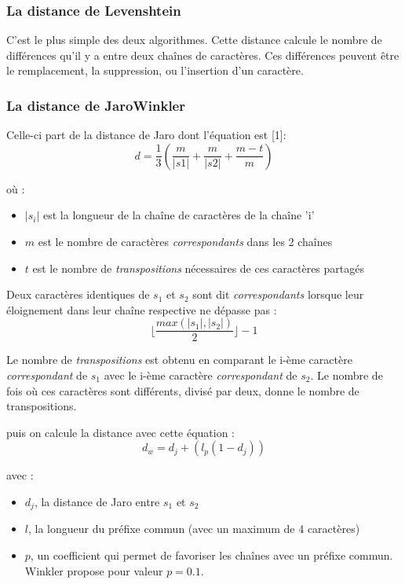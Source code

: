     \subsubsection{La distance de Levenshtein}
C'est le plus simple des deux algorithmes. Cette distance calcule le nombre de différences 
qu'il y a entre deux chaînes de caractères. Ces différences peuvent être le remplacement, la suppression, 
ou l'insertion d'un caractère.

    \subsubsection{La distance de JaroWinkler} 
Celle-ci part de la distance de Jaro dont l'équation est [1]: 
\begin{equation}
 d = \frac{1}{3}(\frac{m}{|s1|}+\frac{m}{|s2|}+\frac{m-t}{m})
\end{equation}

où :
\begin{itemize}
 \item $|s_i|$ est la longueur de la chaîne de caractères de la chaîne 'i'
 \item $m$ est le nombre de caractères \emph{correspondants} dans les 2 chaînes
 \item $t$ est le nombre de \emph{transpositions} nécessaires de ces caractères partagés
\end{itemize}

Deux caractères identiques de $s_1$ et $s_2$ sont dit \emph{correspondants} lorsque leur éloignement dans 
leur chaîne respective ne dépasse pas :
\begin{equation}
 \lfloor{\frac{max(|s_1|, |s_2|)}{2}}\rfloor - 1
\end{equation}

Le nombre de \emph{transpositions} est obtenu en comparant le i-ème caractère \emph{correspondant} de $s_1$ 
avec le i-ème caractère \emph{correspondant} de $s_2$. Le nombre de fois où ces caractères sont différents, 
divisé par deux, donne le nombre de transpositions.

puis on calcule la distance avec cette équation :
\begin{equation}
 d_w = d_j + (l_p(1-d_j))
\end{equation}

avec :
\begin{itemize}
 \item $d_j$, la distance de Jaro entre $s_1$ et $s_2$
 \item $l$, la longueur du préfixe commun (avec un maximum de 4 caractères)
 \item $p$, un coefficient qui permet de favoriser les chaînes avec un préfixe commun. Winkler propose 
pour valeur $p=0.1$.

\end{itemize}

